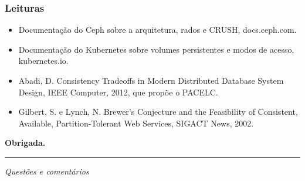 \documentclass[aspectratio=169]{beamer}
\begin{document}
\begin{frame}
\frametitle{Leituras}
\begin{itemize}
    \setlength\itemsep{0.4cm}
    \item Documentação do Ceph sobre a arquitetura, rados e CRUSH, docs.ceph.com.
    \item Documentação do Kubernetes sobre volumes persistentes e modos de acesso, kubernetes.io.
    \item Abadi, D. Consistency Tradeoffs in Modern Distributed Database System Design, IEEE Computer, 2012, que propõe o PACELC.
    \item Gilbert, S. e Lynch, N. Brewer's Conjecture and the Feasibility of Consistent, Available, Partition-Tolerant Web Services, SIGACT News, 2002.
\end{itemize}
\end{frame}

\begin{frame}[plain]
  \vspace*{3cm}
  \begin{center}
    \Huge\bfseries\textcolor{TextEspresso}{Obrigada.}\par
    \vspace{0.5cm}
    {\color{NudeTaupe}\rule{2cm}{0.5pt}}\par
    \vspace{0.5cm}
    \Large\textcolor{TextEspresso}{\itshape Questões e comentários}
  \end{center}
\end{frame}
\end{document}
